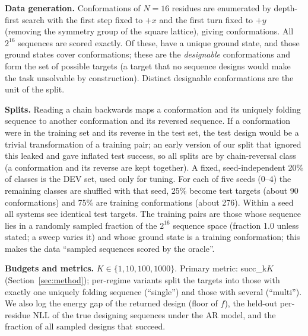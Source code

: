 \textbf{Data generation.} Conformations of $N=16$ residues are enumerated by depth-first search with the first step fixed to $+x$ and the first turn fixed to $+y$ (removing the symmetry group of the square lattice), giving  conformations. All $2^{16}$ sequences are scored exactly. Of these,  have a unique ground state, and those ground states cover  conformations; these are the \emph{designable} conformations and form the set of possible targets (a target that no sequence designs would make the task unsolvable by construction). Distinct designable conformations are the unit of the split.

\textbf{Splits.} Reading a chain backwards maps a conformation and its uniquely folding sequence to another conformation and its reversed sequence. If a conformation were in the training set and its reverse in the test set, the test design would be a trivial transformation of a training pair; an early version of our split that ignored this leaked and gave inflated test success, so all splits are by chain-reversal class (a conformation and its reverse are kept together). A fixed, seed-independent 20\% of classes is the DEV set, used only for tuning. For each of five seeds (0--4) the remaining classes are shuffled with that seed, 25\% become test targets (about 90 conformations) and 75\% are training conformations (about 276). Within a seed all systems see identical test targets. The training pairs are those whose sequence lies in a randomly sampled fraction of the $2^{16}$ sequence space (fraction 1.0 unless stated; a sweep varies it) and whose ground state is a training conformation; this makes the data ``sampled sequences scored by the oracle''.

\textbf{Budgets and metrics.} $K\in\{1,10,100,1000\}$. Primary metric: succ\_k$K$ (Section~\ref{sec:method}); per-regime variants split the targets into those with exactly one uniquely folding sequence (``single'') and those with several (``multi''). We also log the energy gap of the returned design (floor of $f$), the held-out per-residue NLL of the true designing sequences under the AR model, and the fraction of all sampled designs that succeed.


